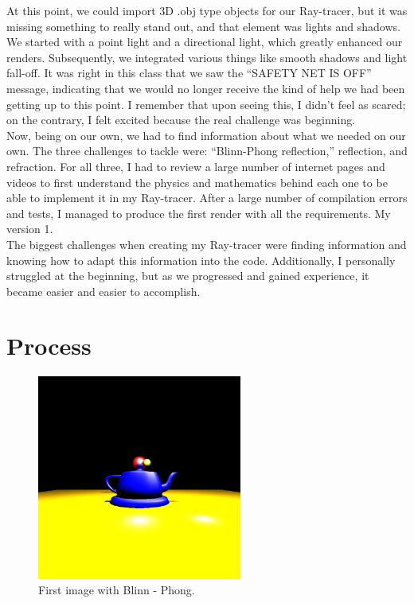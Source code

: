 \documentclass[12pt]{article}
\begin{document}
	At this point, we could import 3D .obj type objects for our Ray-tracer, but it was missing something to really stand out, and that element was lights and shadows. We started with a point light and a directional light, which greatly enhanced our renders. Subsequently, we integrated various things like smooth shadows and light fall-off. It was right in this class that we saw the “SAFETY NET IS OFF” message, indicating that we would no longer receive the kind of help we had been getting up to this point. I remember that upon seeing this, I didn’t feel as scared; on the contrary, I felt excited because the real challenge was beginning.\\
	


	Now, being on our own, we had to find information about what we needed on our own. The three challenges to tackle were: “Blinn-Phong reflection,” reflection, and refraction. For all three, I had to review a large number of internet pages and videos to first understand the physics and mathematics behind each one to be able to implement it in my Ray-tracer. After a large number of compilation errors and tests, I managed to produce the first render with all the requirements. My version 1.\\
	
	The biggest challenges when creating my Ray-tracer were finding information and knowing how to adapt this information into the code. Additionally, I personally struggled at the beginning, but as we progressed and gained experience, it became easier and easier to accomplish.\\






	
	\section{Process}

\begin{figure}[h]
	\centering
	\includegraphics[width=0.6\textwidth]{image.png}
	\caption{First image with Blinn - Phong.}
	\label{fig:image1}
\end{figure}
\end{document}
